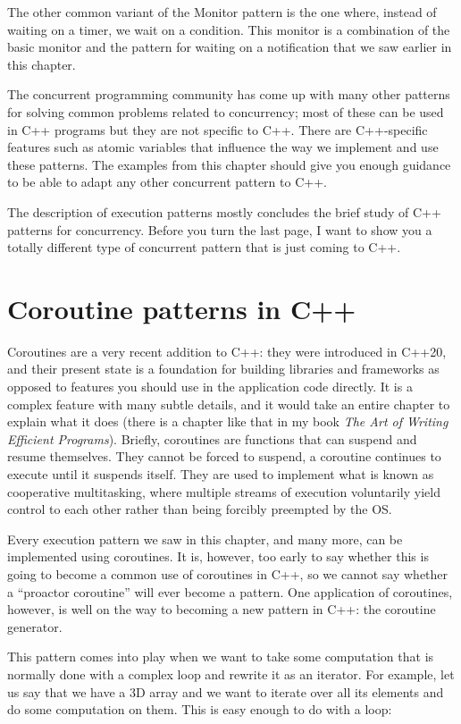 The other common variant of the Monitor pattern is the one where, instead of waiting on a timer, we wait on a condition. This monitor is a combination of the basic monitor and the pattern for waiting on a notification that we saw earlier in this chapter.

The concurrent programming community has come up with many other patterns for solving common problems related to concurrency; most of these can be used in C++ programs but they are not specific to C++. There are C++-specific features such as atomic variables that influence the way we implement and use these patterns. The examples from this chapter should give you enough guidance to be able to adapt any other concurrent pattern to C++.

The description of execution patterns mostly concludes the brief study of C++ patterns for concurrency. Before you turn the last page, I want to show you a totally different type of concurrent pattern that is just coming to C++.

\section{Coroutine patterns in C++}

Coroutines are a very recent addition to C++: they were introduced in C++20, and their present state is a foundation for building libraries and frameworks as opposed to features you should use in the application code directly. It is a complex feature with many subtle details, and it would take an entire chapter to explain what it does (there is a chapter like that in my book \emph{The Art of Writing Efficient Programs}). Briefly, coroutines are functions that can suspend and resume themselves. They cannot be forced to suspend, a coroutine continues to execute until it suspends itself. They are used to implement what is known as cooperative multitasking, where multiple streams of execution voluntarily yield control to each other rather than being forcibly preempted by the OS.

Every execution pattern we saw in this chapter, and many more, can be implemented using coroutines. It is, however, too early to say whether this is going to become a common use of coroutines in C++, so we cannot say whether a ``proactor coroutine'' will ever become a pattern. One application of coroutines, however, is well on the way to becoming a new pattern in C++: the coroutine generator.

This pattern comes into play when we want to take some computation that is normally done with a complex loop and rewrite it as an iterator. For example, let us say that we have a 3D array and we want to iterate over all its elements and do some computation on them. This is easy enough to do with a loop:

